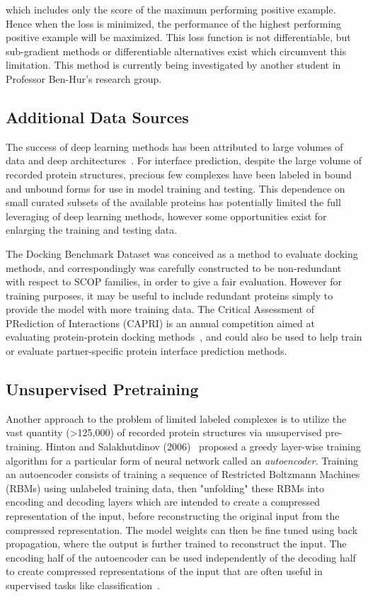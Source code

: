 \noindent
which includes only the score of the maximum performing positive example.
Hence when the loss is minimized, the performance of the highest performing positive example will be maximized.
This loss function is not differentiable, but sub-gradient methods or differentiable alternatives exist which circumvent this limitation.
This method is currently being investigated by another student in Professor Ben-Hur's research group.

\subsection{Additional Data Sources}

The success of deep learning methods has been attributed to large volumes of data and deep architectures~\cite{krizhevsky2012}.
For interface prediction, despite the large volume of recorded protein structures, precious few complexes have been labeled in bound and unbound forms for use in model training and testing. 
This dependence on small curated subsets of the available proteins has potentially limited the full leveraging of deep learning methods, however some opportunities exist for enlarging the training and testing data.

The Docking Benchmark Dataset was conceived as a method to evaluate docking methods, and correspondingly was carefully constructed to be non-redundant with respect to SCOP families, in order to give a fair evaluation.
However for training purposes, it may be useful to include redundant proteins simply to provide the model with more training data. 
The Critical Assessment of PRediction of Interactions (CAPRI) is an annual competition aimed at evaluating protein-protein docking methods~\cite{janin2003}, and could also be used to help train or evaluate partner-specific protein interface prediction methods. 

\subsection{Unsupervised Pretraining}

Another approach to the problem of limited labeled complexes is to utilize the vast quantity (>125,000) of recorded protein structures via unsupervised pre-training.
Hinton and Salakhutdinov (2006)~\cite{hinton2006b} proposed a greedy layer-wise training algorithm for a particular form of neural network called an \emph{autoencoder}.
Training an autoencoder consists of training a sequence of Restricted Boltzmann Machines (RBMs) using unlabeled training data, then "unfolding" these RBMs into encoding and decoding layers which are intended to create a compressed representation of the input, before reconstructing the original input from the compressed representation.
The model weights can then be fine tuned using back propagation, where the output is further trained to reconstruct the input.
The encoding half of the autoencoder can be used independently of the decoding half to create compressed representations of the input that are often useful in supervised tasks like classification~\cite{hinton2006b, bengio2007}.

